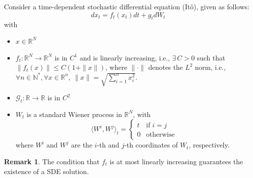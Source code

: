 \documentclass[a4paper,10pt]{article}
\theoremstyle{definition} %
\theoremstyle{definition} %
\theoremstyle{definition} %
\theoremstyle{definition} %
\newtheorem{remark}[definition]{Remark}
\newcommand{\0}{\boldsymbol{0}}
\begin{document}
Consider a time-dependent stochastic differential equation (Itô), given as follows:
    \begin{equation}\label{eq:SDE}
         dx_t = f_t(x_t)dt + g_tdW_t
    \end{equation}
    with 
    \begin{itemize}
        \item[] $x \in \mathbb{R}^N$
        
        \item[] $f_t : \mathbb{R}^N \rightarrow \mathbb{R}^N$ is in $C^1$ and is linearly increasing, i.e., $\exists\, C > 0$ such that $\|f_t(x)\| \leq C(1 + \|x\|)$, where $\|\cdot\|$ denotes the $L^2$ norm, i.e., $\forall n \in \mathbb{N}^*, \forall x \in \mathbb{R}^n,\ \|x\| = \sqrt{\sum\limits_{i=1}^n x_i^2}$.
        
        \item[] $\mathcal{G}_t : \mathbb{R} \rightarrow \mathbb{R}$ is in $C^2$
        
        \item[] $W_t$ is a standard Wiener process in $\mathbb{R}^N$, with
        \begin{equation*}
            \langle W^i, W^j \rangle_t =
            \begin{cases}
                t & \text{if } i = j \\
                0 & \text{otherwise}
            \end{cases}
        \end{equation*}
        where $W^i$ and $W^j$ are the $i$-th and $j$-th coordinates of $W_t$, respectively.
    \end{itemize}
    
    \begin{remark}
        The condition that $f_t$ is at most linearly increasing guarantees the existence of a SDE solution.
    \end{remark}
\end{document}
